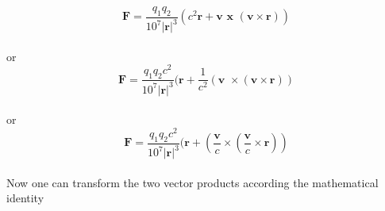 \documentclass[10pt,titlepage]{article}
\begin{document}
\begin{equation}
\textbf{F} = \frac{q_1q_2}{10^7\vert\textbf{r}\vert^3}  (c^2\textbf{r}+\textbf{v }\textbf{x }( {\textbf{v} \times  \textbf{r}}))
\end{equation}\\
or
\begin{equation}
\textbf{F} = \frac{q_1q_2c^2}{10^7\vert\textbf{r}\vert^3}  (\textbf{r}+\frac{1}{c^2}(\textbf{v }\times( {\textbf{v} \times  \textbf{r}}))
\end{equation}\\
or
\begin{equation}
\textbf{F} = \frac{q_1q_2c^2}{10^7\vert\textbf{r}\vert^3}  (\textbf{r}+(\frac{\textbf{v}}{c}\times( {\frac{\textbf{v}}{c}    \times {\textbf{r}}}))
\end{equation}
\\


Now one can transform the two vector products according the mathematical identity
\end{document}
